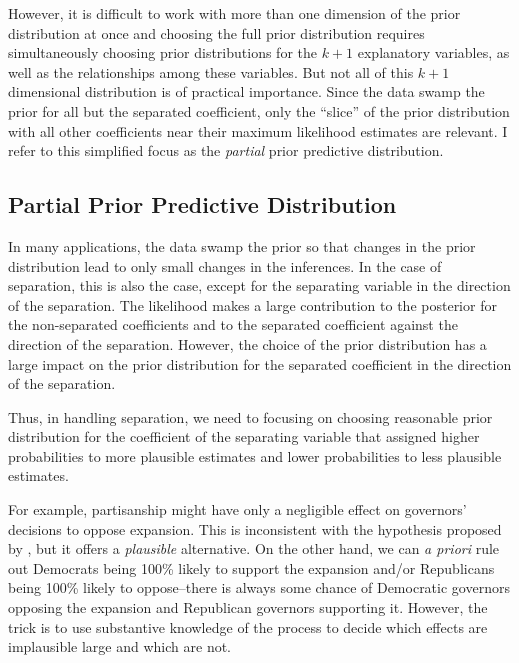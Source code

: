 \documentclass[12pt]{article}
\begin{document}
However, it is difficult to work with more than one dimension of the prior distribution at once and choosing the full prior distribution requires simultaneously choosing prior distributions for the $k + 1$ explanatory variables, as well as the relationships among these variables. But not all of this $k + 1$ dimensional distribution is of practical importance. Since the data swamp the prior for all but the separated coefficient, only the ``slice'' of the prior distribution with all other coefficients near their maximum likelihood estimates are relevant. I refer to this simplified focus as the \emph{partial} prior predictive distribution.

\subsection*{Partial Prior Predictive Distribution}

In many applications, the data swamp the prior so that changes in the prior distribution lead to only small changes in the inferences. In the case of separation, this is also the case, except for the separating variable in the direction of the separation. The likelihood makes a large contribution to the posterior for the non-separated coefficients and to the separated coefficient against the direction of the separation. However, the choice of the prior distribution has a large impact on the prior distribution for the separated coefficient in the direction of the separation.

Thus, in handling separation, we need to focusing on choosing reasonable prior distribution for the coefficient of the separating variable that assigned higher probabilities to more plausible estimates and lower probabilities to less plausible estimates.

For example, partisanship might have only a negligible effect on governors' decisions to oppose expansion. This is inconsistent with the hypothesis proposed by \cite{BarrilleauxRainey2014}, but it offers a \emph{plausible} alternative. On the other hand, we can \textit{a priori} rule out Democrats being 100\% likely to support the expansion and/or Republicans being 100\% likely to oppose--there is always some chance of Democratic governors opposing the expansion and Republican governors supporting it. However, the trick is to use substantive knowledge of the process to decide which effects are implausible large and which are not.
\end{document}

